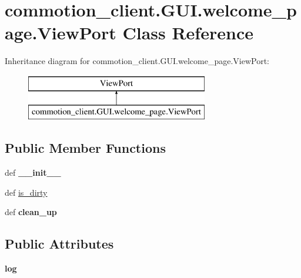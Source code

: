 \hypertarget{classcommotion__client_1_1GUI_1_1welcome__page_1_1ViewPort}{\section{commotion\+\_\+client.\+G\+U\+I.\+welcome\+\_\+page.\+View\+Port Class Reference}
\label{classcommotion__client_1_1GUI_1_1welcome__page_1_1ViewPort}
}
Inheritance diagram for commotion\+\_\+client.\+G\+U\+I.\+welcome\+\_\+page.\+View\+Port\+:\begin{figure}[H]
\begin{center}
\leavevmode
\includegraphics[height=2.000000cm]{classcommotion__client_1_1GUI_1_1welcome__page_1_1ViewPort}
\end{center}
\end{figure}
\subsection*{Public Member Functions}
\begin{DoxyCompactItemize}
\item 
\hypertarget{classcommotion__client_1_1GUI_1_1welcome__page_1_1ViewPort_a816986c73314e7e90ba4105352b819da}{def {\bfseries \+\_\+\+\_\+init\+\_\+\+\_\+}}\label{classcommotion__client_1_1GUI_1_1welcome__page_1_1ViewPort_a816986c73314e7e90ba4105352b819da}

\item 
def \hyperlink{classcommotion__client_1_1GUI_1_1welcome__page_1_1ViewPort_a25e5d500c5e3df779864b936db537770}{is\+\_\+dirty}
\item 
\hypertarget{classcommotion__client_1_1GUI_1_1welcome__page_1_1ViewPort_afdf765ba2c6ae45e8ab8a4172166ac9d}{def {\bfseries clean\+\_\+up}}\label{classcommotion__client_1_1GUI_1_1welcome__page_1_1ViewPort_afdf765ba2c6ae45e8ab8a4172166ac9d}

\end{DoxyCompactItemize}
\subsection*{Public Attributes}
\begin{DoxyCompactItemize}
\item 
\hypertarget{classcommotion__client_1_1GUI_1_1welcome__page_1_1ViewPort_a007c98fbf258770a2e12594c9c083765}{{\bfseries log}}\label{classcommotion__client_1_1GUI_1_1welcome__page_1_1ViewPort_a007c98fbf258770a2e12594c9c083765}

\end{DoxyCompactItemize}
